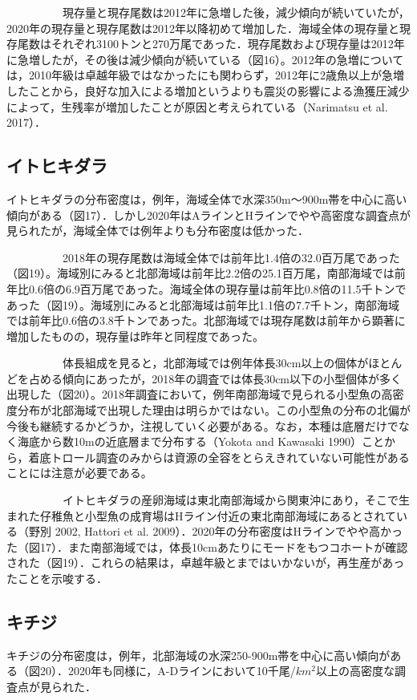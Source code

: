 \documentclass[11pt]{article} %
\begin{document}
\begin{linenumbers}
\ \ \ \ \ \ \ \ \ \ 
現存量と現存尾数は2012年に急増した後，減少傾向が続いていたが，2020年の現存量と現存尾数は2012年以降初めて増加した．海域全体の現存量と現存尾数はそれぞれ3100トンと270万尾であった．現存尾数および現存量は2012年に急増したが，その後は減少傾向が続いている（図16）。2012年の急増については，2010年級は卓越年級ではなかったにも関わらず，2012年に2歳魚以上が急増したことから，良好な加入による増加というよりも震災の影響による漁獲圧減少によって，生残率が増加したことが原因と考えられている（Narimatsu et al. 2017）．

\subsection{イトヒキダラ}
イトヒキダラの分布密度は，例年，海域全体で水深350m～900m帯を中心に高い傾向がある（図17）．しかし2020年はAラインとHラインでやや高密度な調査点が見られたが，海域全体では例年よりも分布密度は低かった．

\ \ \ \ \ \ \ \ \ \ 
2018年の現存尾数は海域全体では前年比1.4倍の32.0百万尾であった（図19）。海域別にみると北部海域は前年比2.2倍の25.1百万尾，南部海域では前年比0.6倍の6.9百万尾であった。海域全体の現存量は前年比0.8倍の11.5千トンであった（図19）。海域別にみると北部海域は前年比1.1倍の7.7千トン，南部海域では前年比0.6倍の3.8千トンであった。北部海域では現存尾数は前年から顕著に増加したものの，現存量は昨年と同程度であった。

\ \ \ \ \ \ \ \ \ \ 
体長組成を見ると，北部海域では例年体長30cm以上の個体がほとんどを占める傾向にあったが，2018年の調査では体長30cm以下の小型個体が多く出現した（図20）。2018年調査において，例年南部海域で見られる小型魚の高密度分布が北部海域で出現した理由は明らかではない。この小型魚の分布の北偏が今後も継続するかどうか，注視していく必要がある。なお，本種は底層だけでなく海底から数10mの近底層まで分布する（Yokota and Kawasaki 1990）ことから，着底トロール調査のみからは資源の全容をとらえきれていない可能性があることには注意が必要である。

\ \ \ \ \ \ \ \ \ \ 
イトヒキダラの産卵海域は東北南部海域から関東沖にあり，そこで生まれた仔稚魚と小型魚の成育場はHライン付近の東北南部海域にあるとされている（野別 2002, Hattori et al. 2009）．2020年の分布密度はHラインでやや高かった（図17）．また南部海域では，体長10cmあたりにモードをもつコホートが確認された（図19）．これらの結果は，卓越年級とまではいかないが，再生産があったことを示唆する．

\subsection{キチジ}
キチジの分布密度は，例年，北部海域の水深250-900m帯を中心に高い傾向がある（図20）．2020年も同様に，A-Dラインにおいて10千尾/$km^2$以上の高密度な調査点が見られた．


\end{linenumbers}
\end{document}
